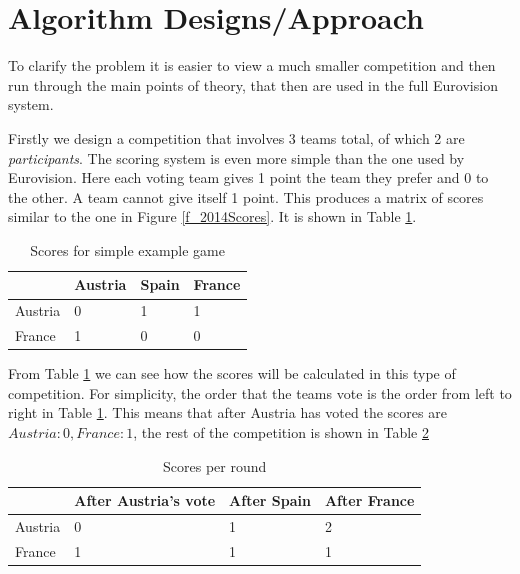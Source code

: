 \documentclass[12pt]{report}
\begin{document}
\section{Algorithm Designs/Approach}\label{AlgorithmDesigns}
To clarify the problem it is easier to view a much smaller competition and then run through the main points of theory, that then are used in the full Eurovision system.

Firstly we design a competition that involves 3 teams total, of which 2 are \textit{participants}. The scoring system is even more simple than the one used by Eurovision. Here each voting team gives 1 point the team they prefer and 0 to the other. A team cannot give itself 1 point. This produces a matrix of scores similar to the one in Figure \ref{f_2014Scores}. It is shown in Table \ref{t_simpleMatrix}.

\begin{table}[H]
\centering
\caption{Scores for simple example game}
\label{t_simpleMatrix}
\begin{tabular}{@{}|l|l|l|l|@{}}
\toprule
        & Austria & Spain & France \\ \midrule
Austria & 0       & 1     & 1      \\ \midrule
France  & 1       & 0     & 0      \\ \bottomrule
\end{tabular}
\end{table}

From Table \ref{t_simpleMatrix} we can see how the scores will be calculated in this type of competition. For simplicity, the order that the teams vote is the order from left to right in Table \ref{t_simpleMatrix}. This means that after Austria has voted the scores are $Austria: 0, France: 1$, the rest of the competition is shown in Table \ref{t_simpleScores}

\begin{table}[H]
\centering
\caption{Scores per round}
\label{t_simpleScores}
\begin{tabular}{@{}|l|l|l|l|@{}}
\toprule
        & After Austria's vote & After Spain & After France \\ \midrule
Austria & 0       & 1     & 2      \\ \midrule
France  & 1       & 1     & 1      \\ \bottomrule
\end{tabular}
\end{table}
\end{document}
